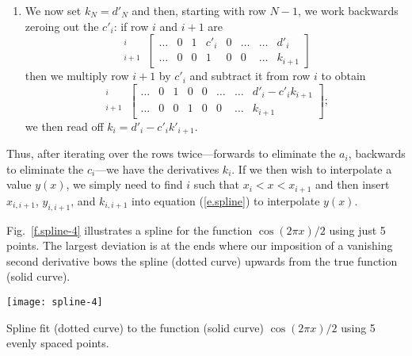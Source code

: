 \begin{enumerate}
\item We now set $k_{N}=d'_{N}$ and then, starting with row $N-1$, we work backwards zeroing out the $c'_{i}$: if row $i$ and $i+1$ are
\[
\begin{array}{r} {}^{i}\\ {}^{i+1}\end{array}\,
\left[\begin{array}{ccccccc|c}
	 \ldots & 0 & 1 & c'_{i} & 0 & \ldots & \ldots & d'_{i}\\
	 \ldots & 0 & 0 & 1      & 0 & 0      & \ldots & k_{i+1}
\end{array}\right]
\]
then we multiply row $i+1$ by $c'_{i}$ and subtract it from row $i$ to obtain
\[
\begin{array}{r} {}^{i}\\ {}^{i+1}\end{array}\,
\left[\begin{array}{ccccccc|c}
	 \ldots & 0 & 1 & 0 & 0 & \ldots & \ldots & d'_{i}-c'_{i}k_{i+1}\\
	 \ldots & 0 & 0 & 1 & 0 & 0      & \ldots & k_{i+1}
\end{array}\right];
\]
we then read off $k_{i} = d'_{i}-c'_{i}k'_{i+1}$.
\end{enumerate}
Thus, after iterating over the rows twice---forwards to eliminate the $a_{i}$, backwards to eliminate the $c_{i}$---we have the derivatives $k_{i}$. If we then wish to interpolate a value $y(x)$, we simply need to find $i$ such that $x_{i}< x < x_{i+1}$ and then insert $x_{i,i+1}$, $y_{i,i+1}$, and $k_{i,i+1}$ into equation (\ref{e.spline}) to interpolate $y(x)$.

Fig.~\ref{f.spline-4} illustrates a spline for the function $\cos(2\pi x)/2$ using just 5 points. The largest deviation is at the ends where our imposition of a vanishing second derivative bows the spline (dotted curve) upwards from the true function (solid curve).
\begin{marginfigure}
\texttt{[image: spline-4]}
\caption[Example of a spline fit]{\label{f.spline-4} Spline fit (dotted curve) to the function (solid curve) $\cos(2\pi x)/2$ using 5 evenly spaced points.}
\end{marginfigure}
